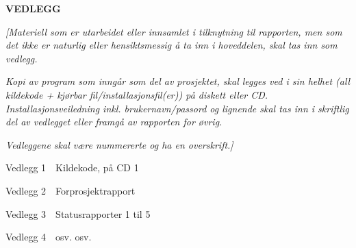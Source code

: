 \documentclass[../main.tex]{subfiles}
\begin{document}
{\bfseries \Large
VEDLEGG}


\bigskip

{\itshape\color{blue}
[Materiell som er utarbeidet eller innsamlet i tilknytning til rapporten, men som det ikke er naturlig eller
hensiktsmessig {\aa} ta inn i hoveddelen, skal tas inn som vedlegg.}

{\itshape\color{blue}
Kopi av program som inng{\aa}r som del av prosjektet, skal legges ved i sin helhet (all kildekode + kj{\o}rbar
fil/installasjonsfil(er)) p{\aa} diskett eller CD. Installasjonsveiledning inkl. brukernavn/passord og lignende skal
tas inn i skriftlig del av vedlegget eller framg{\aa} av rapporten for {\o}vrig.}

{\itshape\color{blue}
Vedleggene skal v{\ae}re nummererte og ha en overskrift.]}

{
Vedlegg 1\ \ Kildekode, p{\aa} CD 1}

{
Vedlegg 2\ \ Forprosjektrapport}

{
Vedlegg 3\ \ Statusrapporter 1 til 5}

{
Vedlegg 4\ \ osv. osv.}
\end{document}
